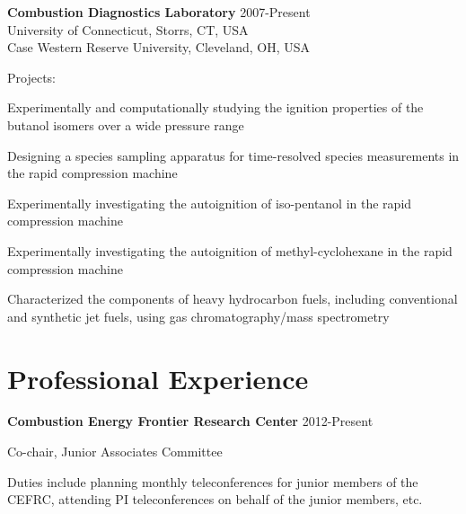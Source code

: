 {\large \bf Combustion Diagnostics Laboratory} \hfill 2007-Present\\
University of Connecticut, Storrs, CT, USA\\
Case Western Reserve University, Cleveland, OH, USA
\begin{outerlist}
\item[] Projects:
   \begin{innerlist}
   \item Experimentally and computationally studying the ignition properties of the butanol isomers over a wide pressure range
   \item Designing a species sampling apparatus for time-resolved species measurements in the rapid compression machine
   \item Experimentally investigating the autoignition of iso-pentanol in the rapid compression machine
   \item Experimentally investigating the autoignition of methyl-cyclohexane in the rapid compression machine
   \item Characterized the components of heavy hydrocarbon fuels, including conventional and synthetic jet fuels, using gas chromatography/mass spectrometry
   \end{innerlist}

\end{outerlist}

\section{Professional Experience}
   \textbf{ Combustion Energy Frontier Research Center} \hfill 2012-Present
   \begin{innerlist}
      \item Co-chair, Junior Associates Committee
      \item Duties include planning monthly teleconferences for junior members of the CEFRC, attending PI teleconferences on behalf of the junior members, etc. 
   \end{innerlist}

